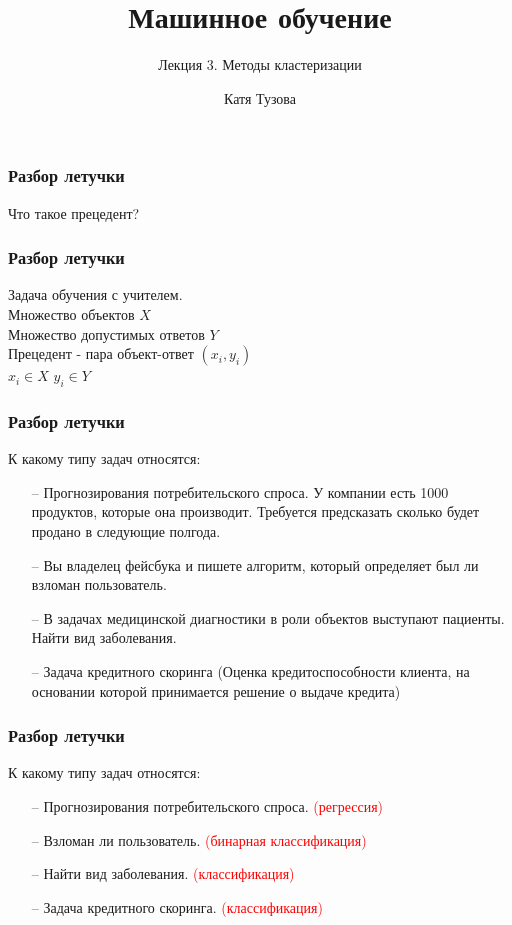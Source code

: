 \documentclass[12pt]{beamer}
\author{Катя Тузова}
\title{Машинное обучение}
\subtitle{Лекция 3. Методы кластеризации}
\date{}
\begin{document}
\frame{\titlepage}


\begin{frame}\frametitle{Разбор летучки}
	Что такое прецедент?
\end{frame}

\begin{frame}\frametitle{Разбор летучки}
	Задача обучения с учителем.\\
	\vspace{5mm}
	Множество объектов $X$ \\
	Множество допустимых ответов $Y$\\
	Прецедент - пара объект-ответ ${(x_i,y_i)}$  \\
	$x_i \in X$ 	$y_i \in Y$
\end{frame}

\begin{frame}\frametitle{Разбор летучки}
	К какому типу задач относятся:
	\begin{itemize}
		\item[--] Прогнозирования потребительского спроса. У компании есть 1000 продуктов, которые она производит. Требуется предсказать сколько будет продано в следующие полгода.
		\item[--] Вы владелец фейсбука и пишете алгоритм, который определяет был ли взломан пользователь. 
		\item[--] В задачах медицинской диагностики в роли объектов выступают пациенты. Найти вид заболевания.
		\item[--] Задача кредитного скоринга (Оценка кредитоспособности клиента, на основании которой принимается решение о выдаче кредита)
	\end{itemize}
\end{frame}

\begin{frame}\frametitle{Разбор летучки}
	К какому типу задач относятся:
	\begin{itemize}
		\item[--] Прогнозирования потребительского спроса. 
\textcolor{red}{(регрессия)}
		\item[--] Взломан ли пользователь. \textcolor{red}{(бинарная классификация)}
		\item[--] Найти вид заболевания. \textcolor{red}{(классификация)}
		\item[--] Задача кредитного скоринга.  \textcolor{red}{(классификация)}
	\end{itemize}
\end{frame}
\end{document}
